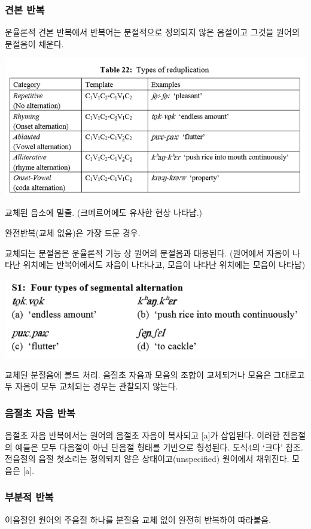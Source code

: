 \subsubsection{견본 반복}
운율론적 견본 반복에서 반복어는 분절적으로 정의되지 않은 음절이고 그것을 원어의 분절음이 채운다.

\includegraphics{Pacoh/src/PacohTable22.png}

교체된 음소에 밑줄. (크메르어에도 유사한 현상 나타남.)

완전반복(교체 없음)은 가장 드문 경우. 

교체되는 분절음은 운율론적 기능 상 원어의 분절음과 대응된다. (원어에서 자음이 나타난 위치에는 반복어에서도 자음이 나타나고, 모음이 나타난 위치에는 모음이 나타남)

\includegraphics{Pacoh/src/PacohS1.png}

교체된 분절음에 볼드 처리. 음절초 자음과 모음의 조합이 교체되거나 모음은 그대로고 두 자음이 모두 교체되는 경우는 관찰되지 않는다.

\subsubsection{음절초 자음 반복}
음절초 자음 반복에서는 원어의 음절초 자음이 복사되고 [a]가 삽입된다. 이러한 전음절의 예들은 모두 다음절이 아닌 단음절 형태를 기반으로 형성된다. 도식4의 `크다' 참조. 전음절의 음절 첫소리는 정의되지 않은 상태이고(unspecified) 원어에서 채워진다. 모음은 [a].

\subsubsection{부분적 반복}
이음절인 원어의 주음절 하나를 분절음 교체 없이 완전히 반복하여 따라붙음. 

